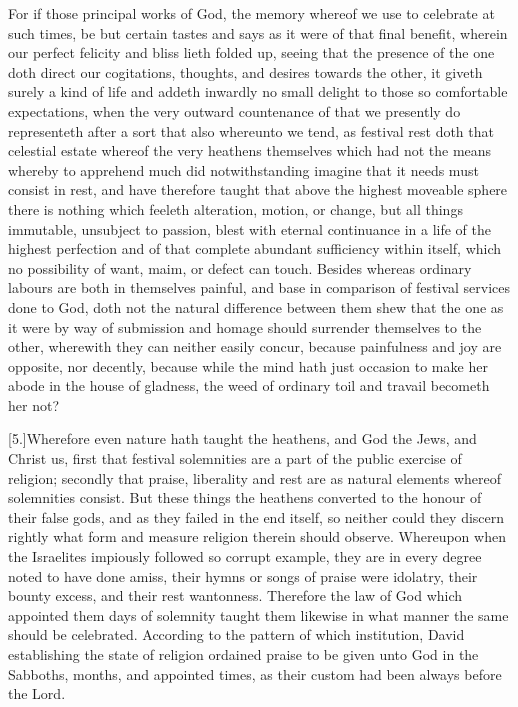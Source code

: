 For if those principal works of God, the memory whereof we use to celebrate at such times, be but certain tastes and says as it were of that final benefit, wherein our perfect felicity and bliss lieth folded up, seeing that the presence of the one doth direct our cogitations, thoughts, and desires towards the other, it giveth surely a kind of life and addeth inwardly no small delight to those so comfortable expectations, when the very outward countenance of that we presently do representeth after a sort that also whereunto we tend, as festival rest doth that celestial estate whereof the very heathens themselves which had not the means whereby to apprehend much did notwithstanding imagine that it needs must consist in rest, and have therefore taught that above the highest moveable sphere there is nothing which feeleth  alteration, motion, or change,
 but all things immutable, unsubject to passion, blest with eternal continuance in a life of the highest perfection and of that complete abundant sufficiency within itself, which no possibility of want, maim, or defect can touch. Besides whereas ordinary labours are both in themselves painful, and base in comparison of festival services done to God, doth not the natural difference between them shew that the one as it were by way of submission and homage should surrender themselves to the other, wherewith they can neither easily concur, because painfulness and joy are opposite, nor decently, because while the mind hath just occasion to make her abode in the house of gladness, the weed of ordinary toil and travail becometh her not?

[5.]Wherefore even nature hath taught the heathens, and God the Jews, and Christ us, first that festival solemnities are a part of the public exercise of religion; secondly that praise, liberality and rest are as natural elements whereof solemnities consist. But these things the heathens converted to the honour of their false gods, and as they failed in the end itself, so neither could they discern rightly what form and measure religion therein should observe. Whereupon when the Israelites impiously followed so corrupt example, they are in every degree noted to have done amiss, their hymns or songs of praise were idolatry, their bounty excess, and their rest wantonness. Therefore the law of God which appointed them days of solemnity taught them likewise in what manner the same should be celebrated. According to the pattern of which institution, David establishing the state of religion ordained praise to be given unto God in the Sabboths, months, and appointed times, as their custom had been always before the Lord.

